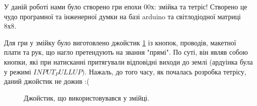 
У даній роботі нами було створено гри епохи 00х: змійка та тетріс!
Створено це чудо програмної та інженерної думки на базі arduino та світлодіодної матриці 8х8.

Для гри у змійку було виготовлено джойстик \ref{joy} із кнопок, проводів, макетної плати та рук, що нагло претендують на звання "прямі".
По суті, він являв собою кнопки, які при натисканні притягували відповідні виходи до землі (ардуінка була у режимі $INPUT_PULLUP)$.
Нажаль, до того часу, як почалась розробка тетрісу, даний джойстик не дожив :(

\begin{figure}[h]
\caption{Джойстик, що використовувався у змійці.}
\label{joy}
\end{figure}